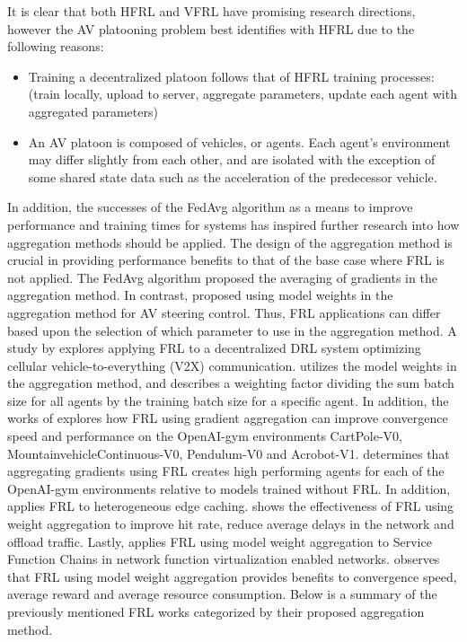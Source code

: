 It is clear that both HFRL and VFRL have promising research directions, however
the AV platooning problem best identifies with HFRL due to the following reasons:

\begin{itemize}
  \item Training a decentralized platoon follows that of HFRL
  training processes: (train locally, upload to server, aggregate parameters, update
  each agent with aggregated parameters)
  \item An AV platoon is composed of vehicles, or agents. Each agent's environment may
  differ slightly from each other, and are isolated with the exception of some shared state
  data such as the acceleration of the predecessor vehicle.
\end{itemize}

In addition, the successes of the FedAvg algorithm as a means to improve performance and training
times for systems has inspired further research into how aggregation methods should
be applied.  The design of the aggregation method is crucial in providing performance
benefits to that of the base case where FRL is not applied.  The FedAvg
\cite{BrendanMcMahan2017a} algorithm proposed the averaging of gradients in the
aggregation method.  In contrast, \cite{Liang2019} proposed using model weights in
the aggregation method for AV steering control. Thus, FRL applications can differ
based upon the selection of which parameter to use in the aggregation method.  A study
by \cite{ZhangX2020} explores applying FRL to a decentralized DRL system optimizing
cellular vehicle-to-everything (V2X) communication. \cite{ZhangX2020} utilizes the model
weights in the aggregation method, and describes a weighting factor dividing the sum
batch size for all agents by the training batch size for a specific agent.  In addition,
the works of \cite{LimHyun2021} explores how FRL using gradient aggregation can improve
convergence speed and performance on the OpenAI-gym environments CartPole-V0,
MountainvehicleContinuous-V0, Pendulum-V0 and Acrobot-V1.  \cite{LimHyun2021} determines
that aggregating gradients using FRL creates high performing agents for each of the
OpenAI-gym environments relative to models trained without FRL.  In addition,
\cite{WangXiaofei2021} applies FRL to heterogeneous edge caching.  \cite{WangXiaofei2021}
shows the effectiveness of FRL using weight aggregation to improve hit rate, reduce
average delays in the network and offload traffic. Lastly, \cite{Huang2021} applies FRL
using model weight aggregation to Service Function Chains in network function virtualization
enabled networks. \cite{Huang2021} observes that FRL using model weight aggregation
provides benefits to convergence speed, average reward and average resource consumption.
Below is a summary of the previously mentioned FRL works categorized by their proposed
aggregation method.


